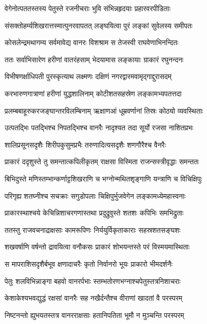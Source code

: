 \twolineshloka
{वेगेनोत्पततस्तस्य पेतुस्ते रजनीचराः}
{भुवि संभिन्नहृदयाः प्रहारवरपीडिताः}


\twolineshloka
{संसक्तोहर्म्यशिखरात्तस्मात्पुनरवापतत्}
{लङ्घयित्वा पुरं लङ्कां सुवेलस्य समीपतः}


\twolineshloka
{कोसलेन्द्रमथागम्य सर्वमावेद्य वानरः}
{विशश्राम स तेजस्वी राघवेणाभिनन्दितः}


\twolineshloka
{ततः सर्वाभिसारेण हरीणां वातरंहसाम्}
{भेदयामास लङ्कायाः ग्राकारं रघुनन्दनः}


\twolineshloka
{विभीषणर्क्षाधिपती पुरस्कृत्याथ लक्ष्मणः}
{दक्षिणं नगरद्वारमवामृद्गाद्दुरासदम्}


\twolineshloka
{करभारुणगात्राणां हरीणां युद्धशालिनाम्}
{कोटीशतसहस्रेण लङ्कामभ्यपतत्तदा}


\twolineshloka
{प्रलम्बबाहूरुकरजङ्घान्तरविलम्बिनाम्}
{ऋक्षाणआं धूम्रवर्णानां तिस्रः कोठ्यो व्यवस्थिताः}


\twolineshloka
{उत्पतद्भिः पतद्भिश्च निपतद्भिश्च वानरैः}
{नादृश्यत तदा सूर्यो रजसा नाशितप्रभः}


\twolineshloka
{शालिप्रसूनसदृशैः शिरीपकुसुमप्रभैः}
{तरुणादित्यसदृशैः शणगौरैश्च वैनरैः}


\twolineshloka
{प्राकारं ददृशुस्ते तु समन्तात्कपिलीकृतम्}
{राक्षसा विस्मिता राजन्सस्त्रीवृद्धाः समन्ततः}


\twolineshloka
{बिभिदुस्ते मणिस्तम्भान्कर्णाट्टशिखराणि च}
{भग्नोन्मथितशृङ्गाणि यन्त्राणि च विचिक्षिपुः}


\twolineshloka
{परिगृह्य शतघ्नीश्च सचक्राः सगुडोपलाः}
{चिक्षिपुर्भुजवेगेन लङ्कामध्येमहास्वनाः}


\twolineshloka
{प्राकारस्थाश्चये केचिन्निशाचरगणास्तथा}
{प्रदुद्रुवुस्ते शतशः कपिभिः समभिद्रुताः}


\twolineshloka
{ततस्तु राजवचनाद्राक्षसाः कामरूपिणः}
{निर्ययुर्विकृताकाराः सहस्रशतसङ्घशः}


\twolineshloka
{शखवर्षाणि वर्षन्तो द्रावयित्वा वनौकसः}
{प्राकारं शोभयन्तस्ते परं विस्मयमास्थिताः}


\twolineshloka
{स मापराशिसदृशैर्बभूव क्षणादाचरैः}
{कृतो निर्वानरो भूयः प्राकारो भीमदर्शनैः}


\twolineshloka
{पेतुः शलविभिन्नाङ्गा बहवो वानरर्पभाः}
{स्तम्भतोरणभग्नाश्चपेतुस्तत्रनिशाचराः}


\twolineshloka
{केशाकेश्यभवद्युद्धं रक्षसां वानरैः सह}
{नखैर्दन्तैश्च वीराणां खादतां वै परस्परम्}


\twolineshloka
{निष्टनन्तो ह्युभयतस्तत्र वानरराक्षसाः}
{हतानिपतिता भूमौ न मुञ्चन्ति परस्परम्}


